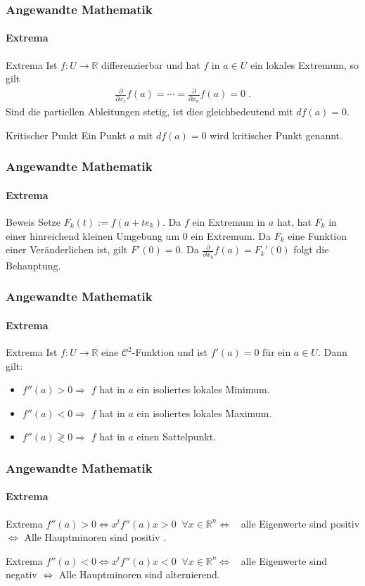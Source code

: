 \documentclass{beamer}
\begin{document}
\begin{frame}
    \frametitle{Angewandte Mathematik}
\framesubtitle{Extrema}
    \begin{block}{Extrema}
 Ist $f: U  \to \mathbb{R}$ differenzierbar und hat  $f$ in $a \in U$ ein lokales Extremum, so gilt 
\begin{align*}
\frac{\partial}{\partial x_{1}} f(a) = \cdots  = \frac{\partial}{\partial x_{n}} f(a) = 0 \;.
\end{align*}
Sind die partiellen Ableitungen stetig, ist dies  gleichbedeutend mit $df(a) = 0$.
\end{block}
    \begin{block}{Kritischer Punkt}
 Ein Punkt $a$ mit $df(a) = 0$ wird kritischer Punkt genannt.
\end{block}

 \end{frame}

\begin{frame}
    \frametitle{Angewandte Mathematik}
\framesubtitle{Extrema}
    \begin{block}{Beweis}
Setze $F_k(t) := f(a + t e_k)$. Da $f$ ein Extremum in $a$ hat, hat $F_k$ in einer hinreichend kleinen Umgebung um $0$ ein Extremum. 
Da $F_k$ eine Funktion einer Veränderlichen ist, gilt $F'(0) = 0$. Da $\frac{\partial}{\partial x_k} f(a) = F_k'(0)$ folgt die Behauptung.
\end{block}
 \end{frame}


\begin{frame}
    \frametitle{Angewandte Mathematik}
\framesubtitle{Extrema}
    \begin{block}{Extrema}
 Ist $f: U  \to \mathbb{R}$ eine $\mathcal{C}^2$-Funktion und ist $f'(a) = 0$ für ein $a \in U$. Dann gilt:
\begin{itemize}
\item $f''(a) > 0 \Rightarrow $ $f$ hat in $a$ ein isoliertes lokales Minimum.
\item $f''(a) < 0 \Rightarrow $ $f$ hat in $a$ ein isoliertes lokales Maximum.
\item $f''(a) \gtrless 0 \Rightarrow $ $f$ hat in $a$ einen Sattelpunkt.
\end{itemize} 
\end{block}
 \end{frame}


\begin{frame}
    \frametitle{Angewandte Mathematik}
\framesubtitle{Extrema}
    \begin{block}{Extrema}
$f''(a) > 0 \Leftrightarrow x^t f''(a) x > 0 \; \; \forall x \in \mathbb{R}^n \Leftrightarrow \; \; $ alle Eigenwerte sind positiv $\Leftrightarrow$ Alle Hauptminoren sind positiv . 
\end{block}
    \begin{block}{Extrema}
$f''(a) < 0 \Leftrightarrow x^t f''(a) x < 0 \; \; \forall x \in \mathbb{R}^n \Leftrightarrow \; \; $ alle Eigenwerte sind negativ $\Leftrightarrow$ Alle Hauptminoren sind alternierend. 
\end{block}
 \end{frame}
\end{document}
